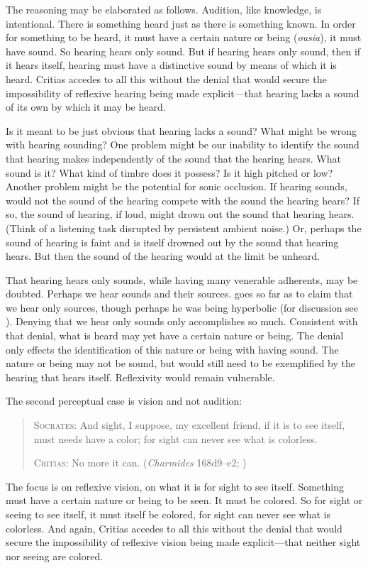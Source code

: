 The reasoning may be elaborated as follows. Audition, like knowledge, is intentional. There is something heard just as there is something known. In order for something to be heard, it must have a certain nature or being (\emph{ousia}), it must have sound. So hearing hears only sound. But if hearing hears only sound, then if it hears itself, hearing must have a distinctive sound by means of which it is heard. Critias accedes to all this without the denial that would secure the impossibility of reflexive hearing being made explicit—that hearing lacks a sound of its own by which it may be heard.

Is it meant to be just obvious that hearing lacks a sound? What might be wrong with hearing sounding? One problem might be our inability to identify the sound that hearing makes independently of the sound that the hearing hears. What sound is it? What kind of timbre does it possess? Is it high pitched or low? Another problem might be the potential for sonic occlusion. If hearing sounds, would not the sound of the hearing compete with the sound the hearing hears? If so, the sound of hearing, if loud, might drown out the sound that hearing hears. (Think of a listening task disrupted by persistent ambient noise.) Or, perhaps the sound of hearing is faint and is itself drowned out by the sound that hearing hears. But then the sound of the hearing would at the limit be unheard.

That hearing hears only sounds, while having many venerable adherents, may be doubted. Perhaps we hear sounds and their sources. \citet{Heidegger:1935uq} goes so far as to claim that we hear only sources, though perhaps he was being hyperbolic (for discussion see \citealt[chapters 3 and 4]{Kalderon:2018oe}). Denying that we hear only sounds only accomplishes so much. Consistent with that denial, what is heard may yet have a certain nature or being. The denial only effects the identification of this nature or being with having sound. The nature or being may not be sound, but would still need to be exemplified by the hearing that hears itself. Reflexivity would remain vulnerable.

The second perceptual case is vision and not audition:
\begin{quotation}
	\textsc{Socrates}: And sight, I suppose, my excellent friend, if it is to see itself, must needs have a color; for sight can never see what is colorless.
	
	\textsc{Critias}: No more it can. (\emph{Charmides} 168d9–e2; \citealt[63]{Lamb:1927qw})
\end{quotation}
The focus is on reflexive vision, on what it is for sight to see itself. Something must have a certain nature or being to be seen. It must be colored. So for sight or seeing to see itself, it must itself be colored, for sight can never see what is colorless. And again, Critias accedes to all this without the denial that would secure the impossibility of reflexive vision being made explicit—that neither sight nor seeing are colored.

